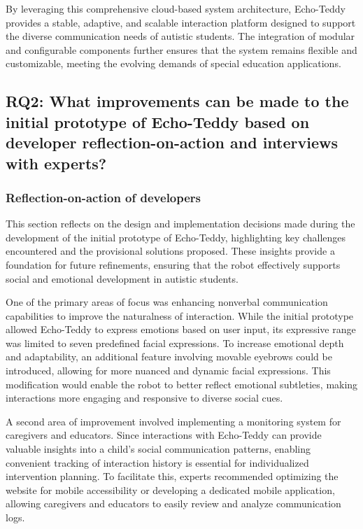 By leveraging this comprehensive cloud-based system architecture, Echo-Teddy provides a stable, adaptive, and scalable interaction platform designed to support the diverse communication needs of autistic students. The integration of modular and configurable components further ensures that the system remains flexible and customizable, meeting the evolving demands of special education applications.

\subsection{RQ2: What improvements can be made to the initial prototype of Echo-Teddy based on developer reflection-on-action and interviews with experts?}

\subsubsection{Reflection-on-action of developers}

This section reflects on the design and implementation decisions made during the development of the initial prototype of Echo-Teddy, highlighting key challenges encountered and the provisional solutions proposed. These insights provide a foundation for future refinements, ensuring that the robot effectively supports social and emotional development in autistic students.

One of the primary areas of focus was enhancing nonverbal communication capabilities to improve the naturalness of interaction. While the initial prototype allowed Echo-Teddy to express emotions based on user input, its expressive range was limited to seven predefined facial expressions. To increase emotional depth and adaptability, an additional feature involving movable eyebrows could be introduced, allowing for more nuanced and dynamic facial expressions. This modification would enable the robot to better reflect emotional subtleties, making interactions more engaging and responsive to diverse social cues.

A second area of improvement involved implementing a monitoring system for caregivers and educators. Since interactions with Echo-Teddy can provide valuable insights into a child's social communication patterns, enabling convenient tracking of interaction history is essential for individualized intervention planning. To facilitate this, experts recommended optimizing the website for mobile accessibility or developing a dedicated mobile application, allowing caregivers and educators to easily review and analyze communication logs. 

